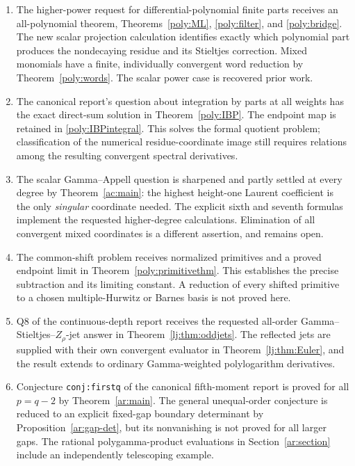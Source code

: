 \documentclass[11pt,a4paper]{article}
\numberwithin{equation}{section}
\theoremstyle{definition}
\theoremstyle{remark}
\begin{document}
\begin{enumerate}
\item The higher-power request for differential-polynomial finite parts
receives an all-polynomial theorem, Theorems~\ref{poly:ML},
\ref{poly:filter}, and \ref{poly:bridge}. The new scalar projection
calculation identifies exactly which polynomial part produces the
nondecaying residue and its Stieltjes correction. Mixed monomials have
a finite, individually convergent word reduction by
Theorem~\ref{poly:words}. The scalar power case is recovered prior work.

\item The canonical report's question about integration by parts at all
weights has the exact direct-sum solution in
Theorem~\ref{poly:IBP}. The endpoint map is retained in
\eqref{poly:IBPintegral}. This solves the formal quotient problem;
classification of the numerical residue-coordinate image still requires
relations among the resulting convergent spectral derivatives.

\item The scalar Gamma--Appell question is sharpened and partly settled
at every degree by Theorem~\ref{ac:main}: the highest height-one Laurent
coefficient is the only \emph{singular} coordinate needed. The explicit
sixth and seventh formulas implement the requested higher-degree
calculations. Elimination of all convergent mixed coordinates is a
different assertion, and remains open.

\item The common-shift problem receives normalized primitives and a
proved endpoint limit in Theorem~\ref{poly:primitivethm}. This establishes
the precise subtraction and its limiting constant. A reduction of every
shifted primitive to a chosen multiple-Hurwitz or Barnes basis is not
proved here.

\item Q8 of the continuous-depth report receives the requested all-order
Gamma--Stieltjes--$Z_\rho$-jet answer in
Theorem~\ref{lj:thm:oddjets}. The reflected jets are supplied with their
own convergent evaluator in Theorem~\ref{lj:thm:Euler}, and the result
extends to ordinary Gamma-weighted polylogarithm derivatives.

\item Conjecture \texttt{conj:firstq} of the canonical fifth-moment
report is proved for all $p=q-2$ by Theorem~\ref{ar:main}.
The general unequal-order conjecture is reduced to an explicit
fixed-gap boundary determinant by Proposition~\ref{ar:gap-det}, but
its nonvanishing is not proved for all larger gaps. The rational
polygamma-product evaluations in Section~\ref{ar:section} include
an independently telescoping example.
\end{enumerate}
\end{document}
